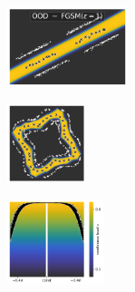 \begin{figure}[H]
    \centering
    \begin{subfigure}
        \centering
        \includegraphics[width=0.388\textwidth,valign=t]{ood-detection/figures/ood-synthesis/ood-line-fgsm.pdf}
    \end{subfigure}
    \begin{subfigure}
        \centering
        \includegraphics[width=0.254\textwidth,valign=t]{ood-detection/figures/ood-synthesis/ood-circle-fgsm.pdf}
    \end{subfigure}
    \begin{subfigure}
        \centering
        \includegraphics[width=0.308\textwidth,valign=t]{ood-detection/figures/ood-synthesis/ood-haystack-fgsm.pdf}
    \end{subfigure}


\end{figure}
